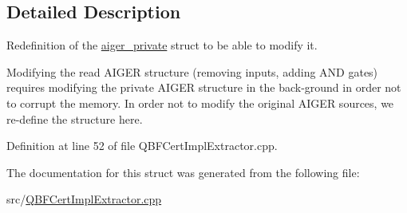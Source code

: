 \subsection{Detailed Description}
Redefinition of the \hyperlink{structaiger__private}{aiger\-\_\-private} struct to be able to modify it. 

Modifying the read A\-I\-G\-E\-R structure (removing inputs, adding A\-N\-D gates) requires modifying the private A\-I\-G\-E\-R structure in the back-\/ground in order not to corrupt the memory. In order not to modify the original A\-I\-G\-E\-R sources, we re-\/define the structure here. 

Definition at line 52 of file Q\-B\-F\-Cert\-Impl\-Extractor.\-cpp.



The documentation for this struct was generated from the following file\-:\begin{DoxyCompactItemize}
\item 
src/\hyperlink{QBFCertImplExtractor_8cpp}{Q\-B\-F\-Cert\-Impl\-Extractor.\-cpp}\end{DoxyCompactItemize}
